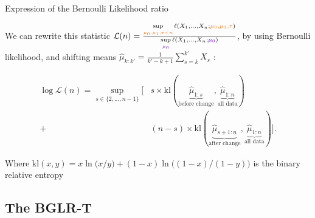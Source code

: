 \documentclass[11pt,english,ignorenonframetext,]{beamer}
\begin{document}
\begin{frame}{Expression of the Bernoulli Likelihood ratio}

  We can rewrite this statistic
  $\mathcal{L}(n) = \frac{\sup\limits_{\textcolor{meca}{\mu_0,\mu_1,\tau < n}}\ell(X_1,\dots,X_n ; \textcolor{meca}{\mu_0,\mu_1,\tau})}{\sup\limits_{\textcolor{deeppurple}{\mu_0}}\ell(X_1,\dots,X_n ;\textcolor{deeppurple}{\mu_0})}$,
  by using Bernoulli likelihood, and shifting means $\widehat{\mu}_{k:k'} = \frac{1}{k'-k+1} \sum\limits_{s=k}^{k'} X_s$ :

  \begin{align*}
    \log \mathcal{L}(n) = \sup_{s \in \{2,\dots,n-1\}} \bigl[
      & s \times \mathrm{kl} (\underbrace{\widehat{\mu}_{1:s}}_{\text{before change}},\underbrace{\widehat{\mu}_{1:n}}_{\text{all data}} ) \\
      + & (n-s) \times \mathrm{kl} (\underbrace{\widehat{\mu}_{s+1:n}}_{\text{after change}},\underbrace{\widehat{\mu}_{1:n}}_{\text{all data}} ) \bigr].
  \end{align*}

  \begin{footnotesize}
    Where $\mathrm{kl}(x,y) =x \ln\bigl(x/y\bigr) + (1-x)\ln\bigl((1-x)/(1-y)\bigr)$ is the binary relative entropy
  \end{footnotesize}

\end{frame}


\subsection{\hfill{}The BGLR-T\hfill{}}
\end{document}

